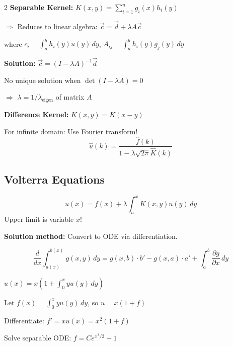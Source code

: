 \documentclass[10pt,a4paper]{article}
\begin{document}
\begin{multicols}{2}
\textbf{Separable Kernel:} $K(x,y) = \sum_{i=1}^n g_i(x)h_i(y)$

$\Rightarrow$ Reduces to linear algebra: $\vec{c} = \vec{d} + \lambda A\vec{c}$

where $c_i = \int_a^b h_i(y)u(y)\,dy$, \quad $A_{ij} = \int_a^b h_i(y)g_j(y)\,dy$

\textbf{Solution:} $\vec{c} = (I - \lambda A)^{-1}\vec{d}$

\begin{warning}
No unique solution when $\det(I-\lambda A) = 0$

$\Rightarrow$ $\lambda = 1/\lambda_{\text{eigen}}$ of matrix $A$
\end{warning}

\textbf{Difference Kernel:} $K(x,y) = K(x-y)$

For infinite domain: Use Fourier transform!
\begin{equation}
\hat{u}(k) = \frac{\hat{f}(k)}{1 - \lambda\sqrt{2\pi}\hat{K}(k)}
\end{equation}

\subsection{Volterra Equations}
\begin{keyformula}
\begin{equation}
u(x) = f(x) + \lambda\int_a^x K(x,y)u(y)\,dy
\end{equation}
Upper limit is variable $x$!
\end{keyformula}

\textbf{Solution method:} Convert to ODE via differentiation.

\begin{keyformula}
\begin{equation}
\frac{d}{dx}\int_{a(x)}^{b(x)} g(x,y)\,dy = g(x,b)\cdot b' - g(x,a)\cdot a' + \int_a^b \frac{\partial g}{\partial x}\,dy
\end{equation}
\end{keyformula}

\begin{example}
$\displaystyle u(x) = x\left(1 + \int_0^x yu(y)\,dy\right)$

Let $f(x) = \int_0^x yu(y)\,dy$, so $u = x(1+f)$

Differentiate: $f' = xu(x) = x^2(1+f)$

Solve separable ODE: $f = Ce^{x^3/3} - 1$


\end{example}
\end{multicols}
\end{document}
